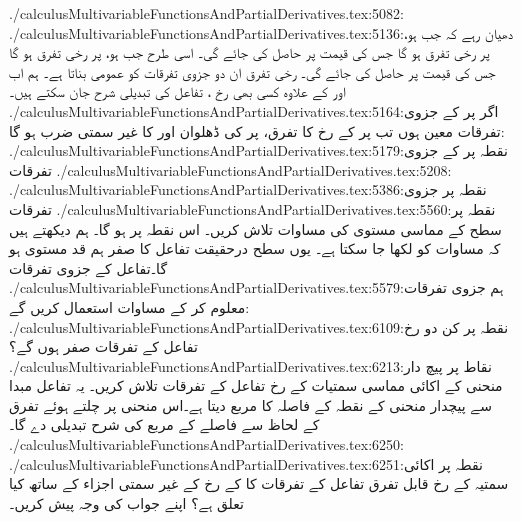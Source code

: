 ./calculusMultivariableFunctionsAndPartialDerivatives.tex:5082:
./calculusMultivariableFunctionsAndPartialDerivatives.tex:5136:دھیان رہے کہ جب  ہو،  پر  رخی تفرق  ہو گا جس کی قیمت  پر حاصل کی جائے گی۔ اسی طرح  جب    ہو،  پر  رخی تفرق  ہو گا جس کی قیمت  پر حاصل کی جائے گی۔ رخی تفرق ان دو جزوی تفرقات کو عمومی بناتا ہے۔ ہم اب  اور  کے علاوہ کسی بھی رخ  ،    تفاعل  کی تبدیلی شرح  جان سکتے ہیں۔
./calculusMultivariableFunctionsAndPartialDerivatives.tex:5164:اگر  پر  کے جزوی تفرقات معین ہوں تب  پر  کے رخ  کا تفرق،    پر  کی ڈھلوان اور  کا  غیر سمتی  ضرب    ہو گا:
./calculusMultivariableFunctionsAndPartialDerivatives.tex:5179:نقطہ  پر  کے جزوی تفرقات
./calculusMultivariableFunctionsAndPartialDerivatives.tex:5208:
./calculusMultivariableFunctionsAndPartialDerivatives.tex:5386:نقطہ  پر جزوی تفرقات
./calculusMultivariableFunctionsAndPartialDerivatives.tex:5560:نقطہ  پر     سطح   کے مماسی مستوی کی مساوات تلاش کریں۔ اس نقطہ پر    ہو گا۔ ہم دیکھتے ہیں کہ مساوات   کو  لکھا  جا سکتا ہے۔ یوں سطح   درحقیقت تفاعل  کا صفر ہم قد مستوی ہو گا۔تفاعل   کے جزوی تفرقات
./calculusMultivariableFunctionsAndPartialDerivatives.tex:5579:ہم  جزوی تفرقات معلوم کر کے مساوات  استعمال کریں گے:
./calculusMultivariableFunctionsAndPartialDerivatives.tex:6109:نقطہ  پر کن دو رخ تفاعل  کے تفرقات  صفر ہوں گے؟
./calculusMultivariableFunctionsAndPartialDerivatives.tex:6213:نقاط   پر پیچ دار  منحنی   کے اکائی مماسی سمتیات کے رخ     تفاعل  کے تفرقات   تلاش کریں۔ یہ تفاعل مبدا سے پیچدار منحنی کے نقطہ  کے  فاصلہ کا مربع  دیتا ہے۔اس منحنی پر چلتے ہوئے   تفرق    کے لحاظ سے فاصلے کے مربع کی شرح تبدیلی دے گا۔
./calculusMultivariableFunctionsAndPartialDerivatives.tex:6250:\\
./calculusMultivariableFunctionsAndPartialDerivatives.tex:6251:نقطہ  پر اکائی سمتیہ   کے رخ قابل تفرق تفاعل   کے تفرقات  کا   کے رخ   کے غیر سمتی اجزاء کے ساتھ کیا  تعلق ہے؟ اپنے جواب کی وجہ پیش کریں۔
